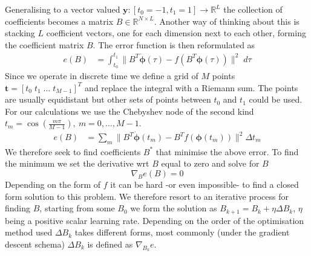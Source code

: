 \documentclass[11pt]{report}
\begin{document}
    Generalising to a vector valued $\pmb{y} : [t_0=-1,t_1=1] \to \mathbb{R}^L$ the collection of coefficients becomes a matrix $B\in \mathbb{R}^{N \times L}$.
    Another way of thinking about this is stacking $L$ coefficient vectors, one for each dimension next to each other, forming the coefficient matrix $B$.
    The error function is then reformulated as
    \begin{align}
        e(B) &= \int_{t_0}^{t_1} \lVert
        B^T \pmb{\dot\phi}(\tau)   -
        f (B^T  \pmb\phi(\tau)  )
        \rVert^2
        \; d\tau
        \label{approx_error}
    \end{align}
    Since we operate in discrete time we define a grid of $M$ points $\pmb{t} = [t_0 \; t_1 \; \dots \; t_{M-1}]^T$ and
    replace the integral with a Riemann sum.
    The points are usually equidistant but other sets of points between $t_0$ and $t_1$ could be used.
    For our calculations we use the Chebyshev node of the second kind $t_m = \cos\left( \frac{m\pi}{M-1} \right), \ m=0,\dots,M-1$.
    \begin{align}
        e(B) &= \sum_m \lVert
        B^T \pmb{\dot\phi}(t_m)  -
        B^T f (  \pmb\phi(t_m)  )
        \rVert^2
        \Delta t_m
        \label{approx_error_sum}
    \end{align}
    We therefore seek to find coefficients $B^*$ that minimise the above error.
    To find the minimum we set the derivative wrt $B$ equal to zero and solve for $B$
    \begin{equation}
        \label{eq:error_zero}
        \nabla_B e(B) = 0
    \end{equation}
    Depending on the form of $f$ it can be hard -or even impossible- to find a closed form solution to this problem.
    We therefore resort to an iterative process for finding $B$, starting from some $B_0$ we form the solution as
    $B_{k+1} = B_{k} + \eta \Delta B_{k}$, $\eta$ being a positive scalar learning rate.
    Depending on the order of the optimisation method used $\Delta B_{k}$ takes different forms, most
    commonly (under the gradient descent schema) $\Delta B_{k}$ is defined as $\nabla_{B_{k}} e$.
\end{document}
